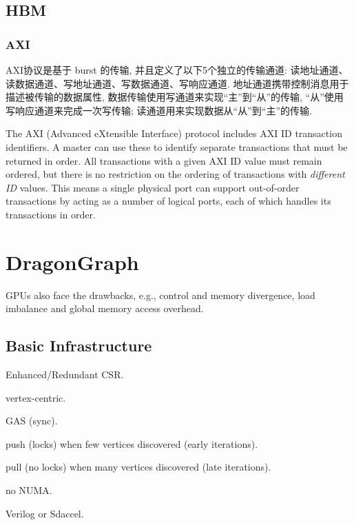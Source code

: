 \documentclass[UTF8,12pt,a4paper]{article}
\begin{document}
\subsection{HBM}
\label{sub:HBM}
\subsubsection{AXI}
AXI协议是基于 burst 的传输,
并且定义了以下5个独立的传输通道:
读地址通道、读数据通道、写地址通道、写数据通道、写响应通道.
地址通道携带控制消息用于描述被传输的数据属性,
数据传输使用写通道来实现``主''到``从''的传输,
``从''使用写响应通道来完成一次写传输;
读通道用来实现数据从``从''到``主''的传输.

The AXI (Advanced eXtensible Interface) protocol
includes AXI ID transaction identifiers.
A master can use these to identify separate transactions that must be returned in order.
All transactions with a given AXI ID value must remain ordered,
but there is no restriction on the ordering of transactions with \textit{different ID} values.
This means a single physical port can support out-of-order transactions
by acting as a number of logical ports,
each of which handles its transactions in order.


\clearpage

\section{DragonGraph}

GPUs also face the drawbacks,
e.g., control and memory divergence,
load imbalance and global memory access overhead.

\subsection{Basic Infrastructure}
\begin{compactitem}
  \item Enhanced/Redundant CSR.
  \item vertex-centric.
  \item GAS (sync).
  \item push (locks) when few vertices discovered (early iterations).
  \item pull (no locks) when many vertices discovered (late iterations).
  \item no NUMA.
  \item Verilog or Sdaccel.
\end{compactitem}
\end{document}

